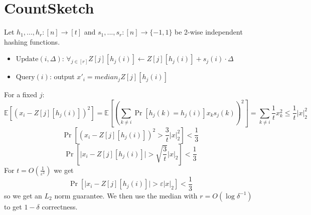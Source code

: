 \documentclass[11pt]{article}
\newcommand{\E}{{\mathbb E}}
\begin{document}
\section{CountSketch \cite{DBLP:conf/icalp/CharikarCF02}}
Let $h_1, ..., h_r: [n] \rightarrow [t]$ and $s_1, ..., s_r: [n] \rightarrow \{-1, 1\}$ be 2-wise independent hashing functions.
\begin{itemize}
\item $\text{Update}(i, \Delta)$: $\forall_{j \in [r]} Z[j][h_j(i)] \leftarrow Z[j][h_j(i)] + s_j(i)\cdot \Delta$ 
\item $\text{Query}(i)$: output $x'_i = median_j Z[j][h_j(i)]$
\end{itemize}
For a fixed $j$:
$$ \E[ (x_i - Z[j][h_j(i)])^2 ] = \E\left[ \left(\sum_{k \neq i} \Pr[h_j(k)=h_j(i)] x_k s_j(k)\right)^2 \right] = \sum_{k \neq i} \frac{1}{t} x_k^2 
\le \frac{1}{t}|x|_2^2 $$
$$\Pr\left[ (x_i - Z[j][h_j(i)])^2 > \frac{3}{t} |x|_2^2 \right] < \frac{1}{3}$$
$$\Pr\left[ \big|x_i - Z[j][h_j(i)]\big| > \sqrt{\frac{3}{t}} |x|_2 \right] < \frac{1}{3} $$
For $t = O\left(\frac{1}{\varepsilon^2}\right)$ we get
$$\Pr\left[ \big|x_i - Z[j][h_j(i)]\big| > \varepsilon|x|_2\right] < \frac{1}{3}$$
so we get an $L_2$ norm guarantee. We then use the median with $r = O(\log\delta^{-1})$ to get $1-\delta$ correctness.




\end{document}
